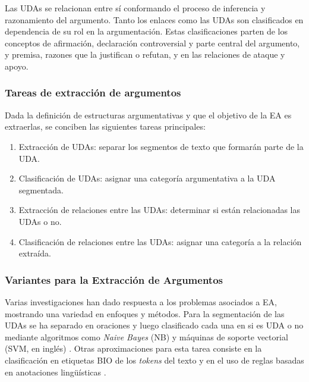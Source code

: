 \documentclass{rcci} %
\begin{document}
Las UDAs se relacionan entre s\'i conformando el proceso de inferencia y razonamiento del argumento.
Tanto los enlaces como las UDAs son clasificados en dependencia de su rol en la argumentaci\'on. Estas clasificaciones 
parten de los conceptos de afirmaci\'on, declaraci\'on controversial y parte central del argumento, y premisa, %
razones que la justifican o refutan, y en las relaciones de ataque y apoyo. 

\subsubsection*{Tareas de extracci\'on de argumentos}

Dada la definici\'on de estructuras argumentativas y que el objetivo de la EA es extraerlas,
se conciben las siguientes tareas principales:

\begin{enumerate}
	\item Extracci\'on de UDAs: separar los segmentos de texto que formar\'an parte de la UDA.
	\item Clasificaci\'on de UDAs: asignar una categor\'ia argumentativa a la UDA segmentada.
	\item Extracci\'on de relaciones entre las UDAs: determinar si est\'an relacionadas las UDAs o no.
	\item Clasificaci\'on de relaciones entre las UDAs: asignar una categor\'ia a la relaci\'on extra\'ida.
\end{enumerate}

\subsubsection*{Variantes para la Extracci\'on de Argumentos}

Varias investigaciones han dado respuesta a los problemas asociados a EA, mostrando
una variedad en enfoques y m\'etodos. Para la segmentaci\'on de las UDAs se ha separado
en oraciones y luego clasificado cada una en si es UDA o no mediante algoritmos como 
\textit{Naive Bayes} (NB) y m\'aquinas de soporte vectorial (SVM, en ingl\'es) \cite{palau2009argumentation,goudas2015argument}.
Otras aproximaciones para esta tarea consiste en la clasificaci\'on en etiquetas BIO
de los \textit{tokens} del texto \cite{goudas2015argument,stab2017parsing,eger2017neural} y en el uso de
reglas basadas en anotaciones ling\"u\'isticas \cite{dykes2020reconstructing}.
\end{document}
